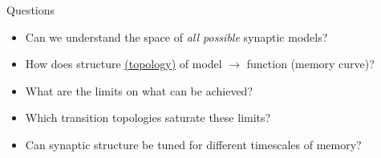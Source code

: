 \documentclass{beamer}%
\newcommand{\M}{\mathbf{M}}
\newcommand{\pot}{^{\text{pot}}}
\newcommand{\dep}{^{\text{dep}}}
\newcommand{\potdep}{^{\text{pot/dep}}}
\begin{document}

\begin{frame}[label=fr_questions]{Questions}
%
 \begin{itemize}
   \item Can we understand the space of \emph{all possible} synaptic models?
   \item How does structure \hyperlink{fr_net<1>}{(topology)} of model $\to$ function (memory curve)?
   \item What are the limits on what can be achieved?
   \item Which transition topologies saturate these limits?
   \item Can synaptic structure be tuned for different timescales of memory?
 \end{itemize}
%
\end{frame}

%
\end{document}
